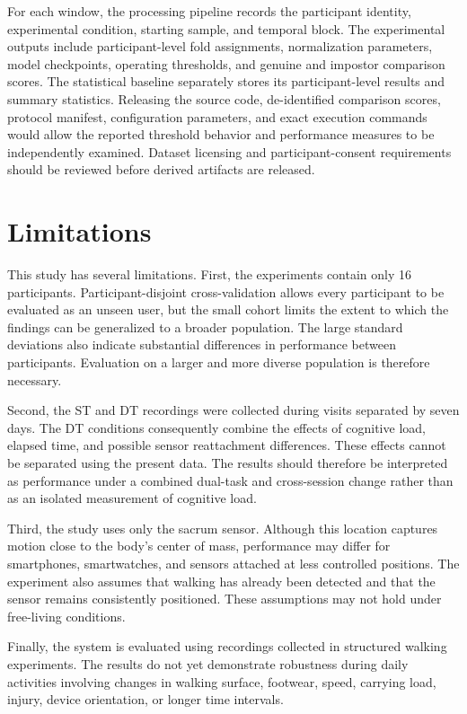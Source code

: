 \documentclass[conference]{IEEEtran}
\begin{document}
For each window, the processing pipeline records the participant identity, experimental condition, starting sample, and temporal block. The experimental outputs include participant-level fold assignments, normalization parameters, model checkpoints, operating thresholds, and genuine and impostor comparison scores. The statistical baseline separately stores its participant-level results and summary statistics. Releasing the source code, de-identified comparison scores, protocol manifest, configuration parameters, and exact execution commands would allow the reported threshold behavior and performance measures to be independently examined. Dataset licensing and participant-consent requirements should be reviewed before derived artifacts are released.


\section{Limitations}

This study has several limitations. First, the experiments contain only 16 participants. Participant-disjoint cross-validation allows every participant to be evaluated as an unseen user, but the small cohort limits the extent to which the findings can be generalized to a broader population. The large standard deviations also indicate substantial differences in performance between participants. Evaluation on a larger and more diverse population is therefore necessary.

Second, the ST and DT recordings were collected during visits separated by seven days. The DT conditions consequently combine the effects of cognitive load, elapsed time, and possible sensor reattachment differences. These effects cannot be separated using the present data. The results should therefore be interpreted as performance under a combined dual-task and cross-session change rather than as an isolated measurement of cognitive load.

Third, the study uses only the sacrum sensor. Although this location captures motion close to the body’s center of mass, performance may differ for smartphones, smartwatches, and sensors attached at less controlled positions. The experiment also assumes that walking has already been detected and that the sensor remains consistently positioned. These assumptions may not hold under free-living conditions.

Finally, the system is evaluated using recordings collected in structured walking experiments. The results do not yet demonstrate robustness during daily activities involving changes in walking surface, footwear, speed, carrying load, injury, device orientation, or longer time intervals.
\end{document}
